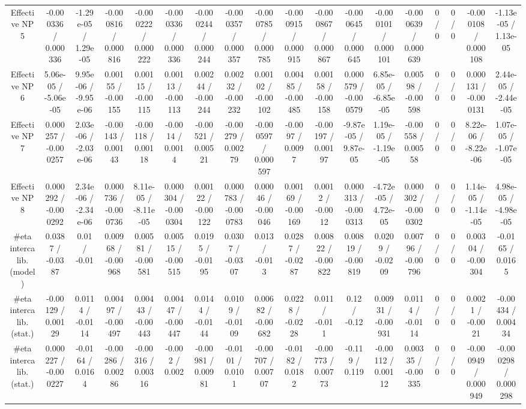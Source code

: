 \documentclass[10pt]{article}
\begin{document}
\begin{table}[htbp]
\begin{center}
\begin{tabular}{|c|c|c|c|c|c|c|c|c|c|c|c|c|c|c|c|c|c|}
  Effective NP 5 & -0.000336 / 0.000336 & -1.29e-05 / 1.29e-05 & -0.000816 / 0.000816 & -0.000222 / 0.000222 & -0.000336 / 0.000336 & -0.000244 / 0.000244 & -0.000357 / 0.000357 & -0.000785 / 0.000785 & -0.000915 / 0.000915 & -0.000867 / 0.000867 & -0.000645 / 0.000645 & -0.000101 / 0.000101 & -0.000639 / 0.000639 & 0 / 0 & 0 / 0 & -0.000108 / 0.000108 & -1.13e-05 / 1.13e-05 \\ 
  Effective NP 6 & 5.06e-05 / -5.06e-05 & 9.95e-06 / -9.95e-06 & 0.00155 / -0.00155 & 0.00115 / -0.00115 & 0.00113 / -0.00113 & 0.00244 / -0.00244 & 0.00232 / -0.00232 & 0.00102 / -0.00102 & 0.00485 / -0.00485 & 0.00158 / -0.00158 & 0.000579 / -0.000579 & 6.85e-05 / -6.85e-05 & 0.00598 / -0.00598 & 0 / 0 & 0 / 0 & 0.000131 / -0.000131 & 2.44e-05 / -2.44e-05 \\ 
  Effective NP 7 & 0.000257 / -0.000257 & 2.03e-06 / -2.03e-06 & -0.00143 / 0.00143 & -0.00118 / 0.00118 & -0.0014 / 0.0014 & -0.00521 / 0.00521 & -0.00279 / 0.00279 & -0.000597 / 0.000597 & -0.0097 / 0.0097 & -0.00197 / 0.00197 & -9.87e-05 / 9.87e-05 & 1.19e-05 / -1.19e-05 & -0.00558 / 0.00558 & 0 / 0 & 0 / 0 & 8.22e-06 / -8.22e-06 & 1.07e-05 / -1.07e-05 \\ 
  Effective NP 8 & 0.000292 / -0.000292 & 2.34e-06 / -2.34e-06 & 0.000736 / -0.000736 & 8.11e-05 / -8.11e-05 & 0.000304 / -0.000304 & 0.00122 / -0.00122 & 0.000783 / -0.000783 & 0.00046 / -0.00046 & 0.00169 / -0.00169 & 0.0012 / -0.0012 & 0.000313 / -0.000313 & -4.72e-05 / 4.72e-05 & 0.000302 / -0.000302 & 0 / 0 & 0 / 0 & 1.14e-05 / -1.14e-05 & 4.98e-05 / -4.98e-05 \\ 
  #eta intercalib. (model) & 0.0387 / -0.0387 & 0.01 / -0.01 & 0.00968 / -0.00968 & 0.00581 / -0.00581 & 0.00515 / -0.00515 & 0.0195 / -0.0195 & 0.0307 / -0.0307 & 0.013 / -0.013 & 0.0287 / -0.0287 & 0.00822 / -0.00822 & 0.00819 / -0.00819 & 0.0209 / -0.0209 & 0.00796 / -0.00796 & 0 / 0 & 0 / 0 & 0.00304 / -0.00304 & -0.0165 / 0.0165 \\ 
  #eta intercalib. (stat.) & -0.00129 / 0.00129 & 0.0114 / -0.0114 & 0.00497 / -0.00497 & 0.00443 / -0.00443 & 0.00447 / -0.00447 & 0.0144 / -0.0144 & 0.0109 / -0.0109 & 0.00682 / -0.00682 & 0.0228 / -0.0228 & 0.011 / -0.011 & 0.12 / -0.12 & 0.00931 / -0.00931 & 0.0114 / -0.0114 & 0 / 0 & 0 / 0 & 0.0021 / -0.0021 & -0.00434 / 0.00434 \\ 
  #eta intercalib. (stat.) & 0.000227 / -0.000227 & -0.0164 / 0.0164 & -0.00286 / 0.00286 & -0.00316 / 0.00316 & -0.002 / 0.002 & -0.00981 / 0.00981 & -0.0101 / 0.0101 & -0.00707 / 0.00707 & -0.0182 / 0.0182 & -0.00773 / 0.00773 & -0.119 / 0.119 & -0.00112 / 0.00112 & 0.00335 / -0.00335 & 0 / 0 & 0 / 0 & -0.000949 / 0.000949 & -0.000298 / 0.000298 \\ 

\end{tabular}
\end{center}
\end{table}
\end{document}
